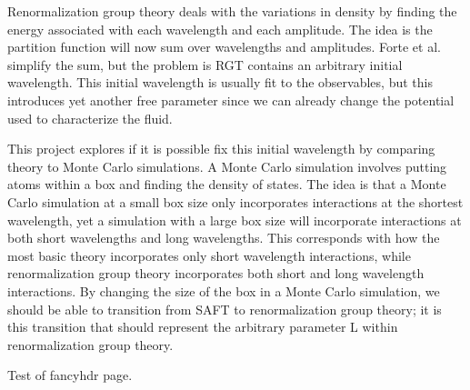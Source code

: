 Renormalization group theory deals with the variations in density by finding the energy associated with each wavelength and each amplitude. The idea is the partition function will now sum over wavelengths and amplitudes. Forte et al. simplify the sum, but the problem is RGT contains an arbitrary initial wavelength. This initial wavelength is usually fit to the observables, but this introduces yet another free parameter since we can already change the potential used to characterize the fluid. 

This project explores if it is possible fix this initial wavelength by comparing theory to Monte Carlo simulations. A Monte Carlo simulation involves putting atoms within a box and finding the density of states. The idea is that a Monte Carlo simulation at a small box size only incorporates interactions at the shortest wavelength, yet a simulation with a large box size will incorporate interactions at both short wavelengths and long wavelengths. This corresponds with how the most basic theory incorporates only short wavelength interactions, while renormalization group theory incorporates both short and long wavelength interactions. By changing the size of the box in a Monte Carlo simulation, we should be able to transition from SAFT to renormalization group theory; it is this transition that should represent the arbitrary parameter L within renormalization group theory.




\newpage

Test of fancyhdr page.
